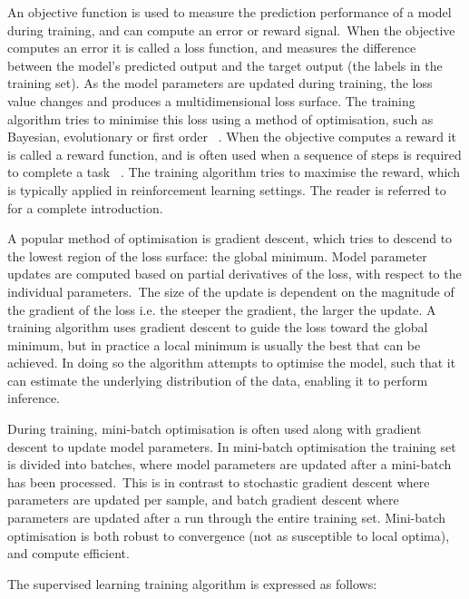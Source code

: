 \noindent An objective function is used to measure the prediction performance of a model during training, and can compute an error or reward signal.\ When the objective computes an error it is called a loss function, and measures the difference between the model's predicted output and the target output (the labels in the training set). As the model parameters are updated during training, the loss value changes and produces a multidimensional loss surface. The training algorithm tries to minimise this loss using a method of optimisation, such as Bayesian, evolutionary or first order \unskip ~\citep{hastie2009elements, bishop2006pattern}. When the objective computes a reward it is called a reward function, and is often used when a sequence of steps is required to complete a task \unskip ~\citep{murphy2012machine}. The training algorithm tries to maximise the reward, which is typically applied in reinforcement learning settings. The reader is referred to \unskip~\citep {sutton2018reinforcement} for a complete introduction. \par

\noindent A popular method of optimisation is gradient descent, which tries to descend to the lowest region of the loss surface: the global minimum. Model parameter updates are computed based on partial derivatives of the loss, with respect to the individual parameters.\ The size of the update is dependent on the magnitude of the gradient of the loss i.e. the steeper the gradient, the larger the update. A training algorithm uses gradient descent to guide the loss toward the global minimum, but in practice a local minimum is usually the best that can be achieved. In doing so the algorithm attempts to optimise the model, such that it can estimate the underlying distribution of the data, enabling it to perform inference. \par

\noindent During training, mini-batch optimisation is often used along with gradient descent to update model parameters. In mini-batch optimisation the training set is divided into batches, where model parameters are updated after a mini-batch has been processed.\ This is in contrast to stochastic gradient descent where parameters are updated per sample, and batch gradient descent where parameters are updated after a run through the entire training set. Mini-batch optimisation is both robust to convergence (not as susceptible to local optima), and compute efficient. \par

\noindent The supervised learning training algorithm is expressed as follows: \par 

